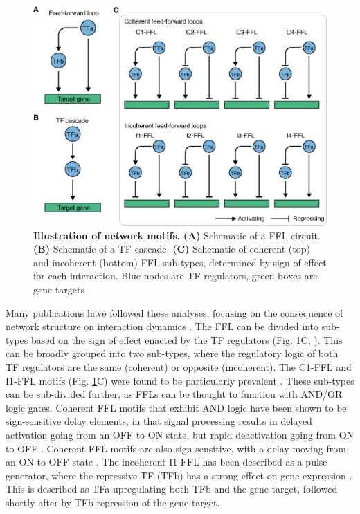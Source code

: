 \begin{figure}[htbp]
    \centering
    \includegraphics[width=\textwidth,height=\textheight,keepaspectratio]{figures/chapter1/ch1_net-motifs.png}
    \caption[{Illustration of network motifs.}]
    {\textbf{Illustration of network motifs.} 
    \textbf{(A)} Schematic of a FFL circuit.  
    \textbf{(B)} Schematic of a TF cascade. 
    \textbf{(C)} Schematic of coherent (top) and incoherent (bottom) FFL sub-types, determined by sign of effect for each interaction. 
    Blue nodes are TF regulators, green boxes are gene targets
    }
    \label{fig:ch1_net-motifs}
\end{figure}

Many publications have followed these analyses, focusing on the consequence of network structure on interaction dynamics \citep{goentoro_incoherent_2009, joanito_incoherent_2018, mangan_incoherent_2006, mangan_structure_2003}. The FFL can be divided into sub-types based on the sign of effect enacted by the TF regulators (Fig. \ref{fig:ch1_net-motifs}C, \cite{mangan_structure_2003}). This can be broadly grouped into two sub-types, where the regulatory logic of both TF regulators are the same (coherent) or opposite (incoherent). The C1-FFL and I1-FFL motifs (Fig. \ref{fig:ch1_net-motifs}C) were found to be particularly prevalent \citep{joanito_incoherent_2018, mangan_incoherent_2006}. These sub-types can be sub-divided further, as FFLs can be thought to function with AND/OR logic gates. Coherent FFL motifs that exhibit AND logic have been shown to be sign-sensitive delay elements, in that signal processing results in delayed activation going from an OFF to ON state, but rapid deactivation going from ON to OFF \citep{mangan_coherent_2003}. Coherent FFL motifs are also sign-sensitive, with a delay moving from an ON to OFF state \citep{kalir_coherent_2005}. The incoherent I1-FFL has been described as a pulse generator, where the repressive TF (TFb) has a strong effect on gene expression \citep{mangan_structure_2003, basu_spatiotemporal_2004}. This is described as TFa upregulating both TFb and the gene target, followed shortly after by TFb repression of the gene target. 

